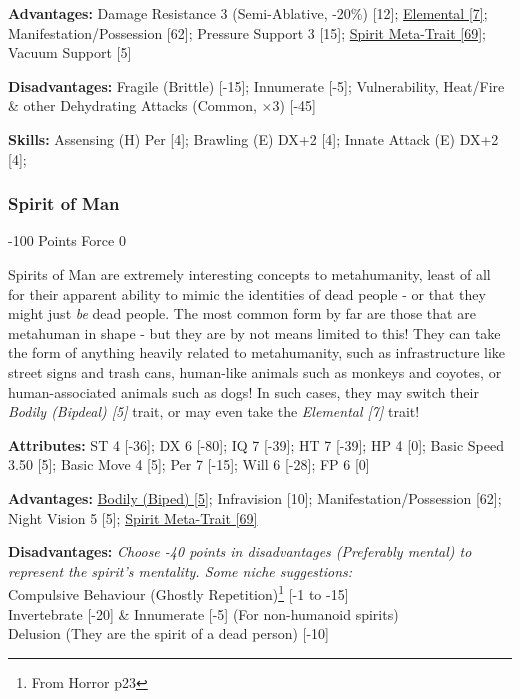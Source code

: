 \begin{multicols}{3}
	\textbf{Advantages:}
	Damage Resistance 3 (Semi-Ablative, -20\%) [12]; \hyperref[elemental]{Elemental [7]}; Manifestation/Possession [62]; Pressure Support 3 [15]; \hyperref[spirit_meta_trait]{Spirit Meta-Trait [69]}; Vacuum Support [5]
	
	\textbf{Disadvantages:}
	Fragile (Brittle) [-15]; Innumerate [-5]; Vulnerability, Heat/Fire \& other Dehydrating Attacks (Common, \(\times3\)) [-45]
	
	\textbf{Skills:}
	Assensing (H) Per [4]; Brawling (E) DX+2 [4]; Innate Attack (E) DX+2 [4];
	
	\subsubsection{Spirit of Man}
	\begin{flushright}
		-100 Points Force 0
	\end{flushright}
	
	Spirits of Man are extremely interesting concepts to metahumanity, least of all for their apparent ability to mimic the identities of dead people - or that they might just \textit{be} dead people. The most common form by far are those that are metahuman in shape - but they are by not means limited to this! They can take the form of anything heavily related to metahumanity, such as infrastructure like street signs and trash cans, human-like animals such as monkeys and coyotes, or human-associated animals such as dogs! In such cases, they may switch their \textit{Bodily (Bipdeal) [5]} trait, or may even take the \textit{Elemental [7]} trait!
	
	\textbf{Attributes:}
	ST 4 [-36]; DX 6 [-80]; IQ 7 [-39]; HT 7 [-39]; HP 4 [0]; Basic Speed 3.50 [5]; Basic Move 4 [5]; Per 7 [-15]; Will 6 [-28]; FP 6 [0]
	
	\textbf{Advantages:}
	\hyperref[bodily]{Bodily (Biped) [5]}; Infravision [10]; Manifestation/Possession [62]; Night Vision 5 [5];  \hyperref[spirit_meta_trait]{Spirit Meta-Trait [69]}
	
	\textbf{Disadvantages:}
	\textit{Choose -40 points in disadvantages (Preferably mental) to represent the spirit's mentality. Some niche suggestions:\\}
	Compulsive Behaviour (Ghostly Repetition)\footnote{From Horror p23} [-1 to -15]\\
	Invertebrate [-20] \& Innumerate [-5] (For non-humanoid spirits)\\
	Delusion (They are the spirit of a dead person) [-10]\\
	

\end{multicols}
